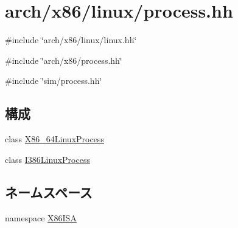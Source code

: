 \hypertarget{arch_2x86_2linux_2process_8hh}{
\section{arch/x86/linux/process.hh}
\label{arch_2x86_2linux_2process_8hh}
}
{\ttfamily \#include \char`\"{}arch/x86/linux/linux.hh\char`\"{}}\par
{\ttfamily \#include \char`\"{}arch/x86/process.hh\char`\"{}}\par
{\ttfamily \#include \char`\"{}sim/process.hh\char`\"{}}\par
\subsection*{構成}
\begin{DoxyCompactItemize}
\item 
class \hyperlink{classX86ISA_1_1X86__64LinuxProcess}{X86\_\-64LinuxProcess}
\item 
class \hyperlink{classX86ISA_1_1I386LinuxProcess}{I386LinuxProcess}
\end{DoxyCompactItemize}
\subsection*{ネームスペース}
\begin{DoxyCompactItemize}
\item 
namespace \hyperlink{namespaceX86ISA}{X86ISA}
\end{DoxyCompactItemize}
